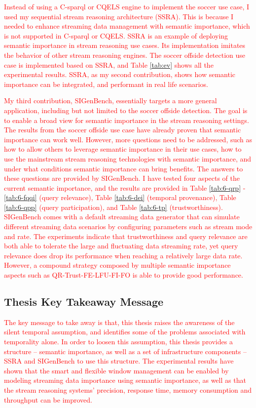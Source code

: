 \textcolor{red}{
Instead of using a C-sparql or CQELS engine to implement the soccer use case, I used my sequential stream reasoning architecture (SSRA).
This is because I needed to enhance streaming data management with semantic importance, which is not supported in C-sparql or CQELS. 
SSRA is an example of deploying semantic importance in stream reasoning use cases. 
Its implementation imitates the behavior of other stream reasoning engines.
The soccer offside detection use case is implemented based on SSRA, and Table \ref{tab:ev} shows all the experimental results.
SSRA, as my second contribution, shows how semantic importance can be integrated, and performant in real life scenarios. 
}

\textcolor{red}{
My third contribution, SIGenBench, essentially targets a more general application, including but not limited to the soccer offside detection. 
The goal is to enable a broad view for semantic importance in the stream reasoning settings. 
The results from the soccer offside use case have already proven that semantic importance can work well. 
However, more questions need to be addressed, such as how to allow others to leverage semantic importance in their use cases, how to use the mainstream stream reasoning technologies with semantic importance, and under what conditions semantic importance can bring benefits. 
The answers to these questions are provided by SIGenBench. 
I have tested four aspects of the current semantic importance, and the results are provided in Table \ref{tab:6-qrp} - \ref{tab:6-fqqi} (query relevance), Table \ref{tab:6-dei} (temporal provenance), Table \ref{tab:6-qpp} (query participation), and Table \ref{tab:6-tp} (trustworthiness). 
SIGenBench comes with a default streaming data generator that can simulate different streaming data scenarios by configuring parameters such as stream mode and rate. 
The experiments indicate that trustworthiness and query relevance are both able to tolerate the large and fluctuating data streaming rate, yet query relevance does drop its performance when reaching a relatively large data rate. 
However, a compound strategy composed by multiple semantic importance aspects such as QR-Trust-FE-LFU-FI-FO is able to provide good performance.
}
%
\subsection{Thesis Key Takeaway Message}
\textcolor{red}{
The key message to take away is that, this thesis raises the awareness of the silent temporal assumption, and identifies some of the problems associated with temporality alone.
In order to loosen this assumption, this thesis provides a structure -- semantic importance, as well as a set of infrastructure components -- SSRA and SIGenBench to use this structure. 
The experimental results have shown that the smart and flexible window management can be enabled by modeling streaming data importance using semantic importance, as well as that the stream reasoning systems' precision, response time, memory consumption and throughput can be improved.
}
%
